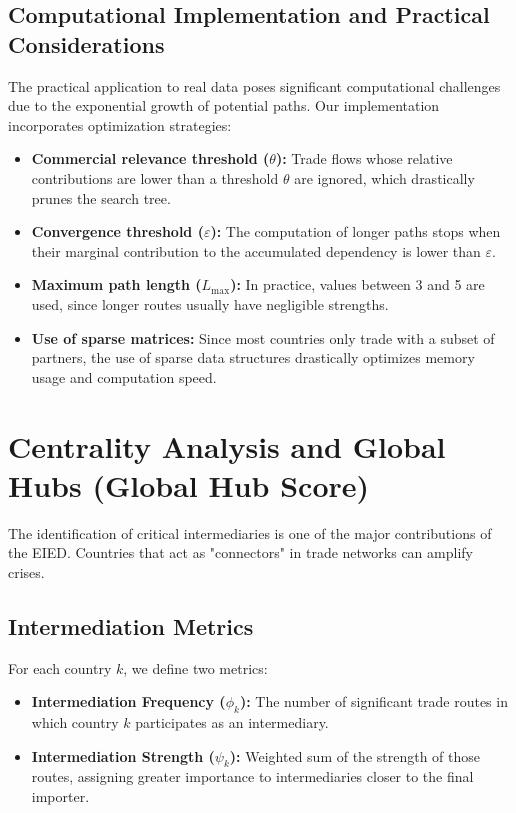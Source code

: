 \documentclass[final,1p,times,authoryear]{elsarticle}
\begin{document}
\subsection{Computational Implementation and Practical Considerations}
The practical application to real data poses significant computational challenges due to the exponential growth of potential paths. Our implementation incorporates optimization strategies:
\begin{itemize}
    \item \textbf{Commercial relevance threshold ($\theta$):} Trade flows whose relative contributions are lower than a threshold $\theta$ are ignored, which drastically prunes the search tree.
    \item \textbf{Convergence threshold ($\varepsilon$):} The computation of longer paths stops when their marginal contribution to the accumulated dependency is lower than $\varepsilon$.
    \item \textbf{Maximum path length ($L_{\max}$):} In practice, values between 3 and 5 are used, since longer routes usually have negligible strengths.
    \item \textbf{Use of sparse matrices:} Since most countries only trade with a subset of partners, the use of sparse data structures drastically optimizes memory usage and computation speed.
\end{itemize}

\section{Centrality Analysis and Global Hubs (Global Hub Score)}

The identification of critical intermediaries is one of the major contributions of the EIED. Countries that act as "connectors" in trade networks can amplify crises.

\subsection{Intermediation Metrics}
For each country $k$, we define two metrics:
\begin{itemize}
    \item \textbf{Intermediation Frequency ($\phi_k$):} The number of significant trade routes in which country $k$ participates as an intermediary.
    \item \textbf{Intermediation Strength ($\psi_k$):} Weighted sum of the strength of those routes, assigning greater importance to intermediaries closer to the final importer.
\end{itemize}
\end{document}
